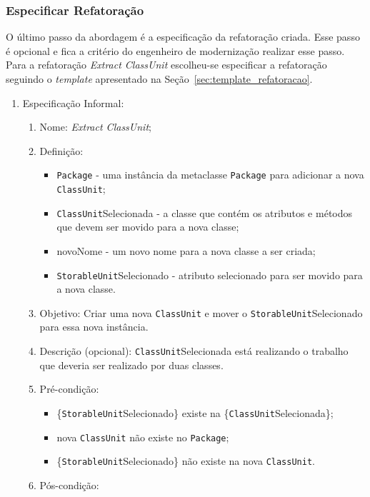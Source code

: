 \subsubsection{Especificar Refatoração}

O último passo da abordagem é a especificação da refatoração criada. Esse passo é opcional e fica a critério do engenheiro de modernização realizar esse passo. Para a refatoração \textit{Extract ClassUnit} escolheu-se especificar a refatoração seguindo o \textit{template} apresentado na Seção~\ref{sec:template_refatoracao}.


\begin{enumerate}
	\item Especificação Informal:
		\begin{enumerate}
			\item Nome: \textit{Extract ClassUnit};
			\item Definição:
			    \begin{itemize}
			        \item \texttt{Package} - uma instância da metaclasse \texttt{Package} para adicionar a nova \texttt{ClassUnit};
			        \item \texttt{ClassUnit}Selecionada - a classe que contém os atributos e métodos que devem ser movido para a nova classe;
			        \item novoNome - um novo nome para a nova classe a ser criada;
			        \item \texttt{StorableUnit}Selecionado - atributo selecionado para ser movido para a nova classe.
			    \end{itemize}
			\item Objetivo: Criar uma nova \texttt{ClassUnit} e mover o \texttt{StorableUnit}Selecionado para essa nova instância.
			\item Descrição (opcional): \texttt{ClassUnit}Selecionada está realizando o trabalho que deveria ser realizado por duas classes.
			\item Pré-condição:
			    \begin{itemize}
			        \item \{\texttt{StorableUnit}Selecionado\} existe na \{\texttt{ClassUnit}Selecionada\};
			        \item nova \texttt{ClassUnit} não existe no \texttt{Package};
			        \item \{\texttt{StorableUnit}Selecionado\} não existe na nova \texttt{ClassUnit}.
			    \end{itemize}
			\item Pós-condição:
			    \begin{itemize}
			        

\end{itemize}
\end{enumerate}
\end{enumerate}
